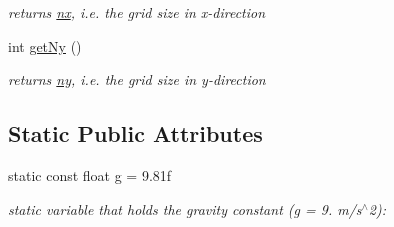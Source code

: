 \begin{DoxyCompactItemize}
\begin{DoxyCompactList}\small\item\em returns \hyperlink{classSWE__Block_a46ec0dc1157997bd255fb39924f1e2bb}{nx}, i.\-e. the grid size in x-\/direction \end{DoxyCompactList}\item 
\hypertarget{classSWE__Block_a4b65557b6f73ffb6454dad3dbf86e9ad}{int \hyperlink{classSWE__Block_a4b65557b6f73ffb6454dad3dbf86e9ad}{get\-Ny} ()}\label{classSWE__Block_a4b65557b6f73ffb6454dad3dbf86e9ad}

\begin{DoxyCompactList}\small\item\em returns \hyperlink{classSWE__Block_a3f139630d12423eb4bd7df3e45c7f5da}{ny}, i.\-e. the grid size in y-\/direction \end{DoxyCompactList}\end{DoxyCompactItemize}
\subsection*{Static Public Attributes}
\begin{DoxyCompactItemize}
\item 
\hypertarget{classSWE__Block_a073ca743ff4077a7e456906be704958f}{static const float \hyperlink{classSWE__Block_a073ca743ff4077a7e456906be704958f}{g} = 9.\-81f}\label{classSWE__Block_a073ca743ff4077a7e456906be704958f}

\begin{DoxyCompactList}\small\item\em static variable that holds the gravity constant (g = 9. m/s$^\wedge$2)\-: \end{DoxyCompactList}\end{DoxyCompactItemize}
